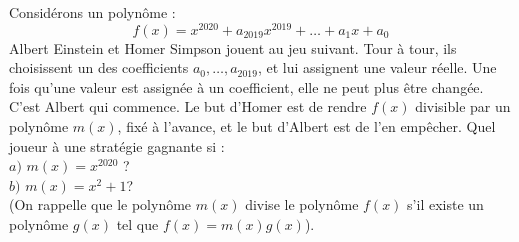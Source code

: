 Considérons un polynôme : $$f(x)=x^{2020} + a_{2019}x^{2019} + \dots + a_1x + a_0$$
Albert Einstein et Homer Simpson jouent au jeu suivant. Tour à tour, ils choisissent un des coefficients $a_0, \dots, a_{2019}$, et lui assignent une valeur réelle. Une fois qu’une valeur est assignée à un coefficient, elle ne peut plus être changée. C’est Albert qui commence. Le but d’Homer est de rendre $f(x)$ divisible par un polynôme $m(x)$, fixé à l’avance, et le but d’Albert est de l’en empêcher. Quel joueur à une stratégie gagnante si :\\
$a)$ $m(x)=x^{2020}$ ?\\ $b)$ $m(x)=x^2 +1$?\\
(On rappelle que le polynôme $m(x)$ divise le polynôme $f(x)$ s’il existe un polynôme $g(x)$ tel que $f(x)=m(x)g(x)$).